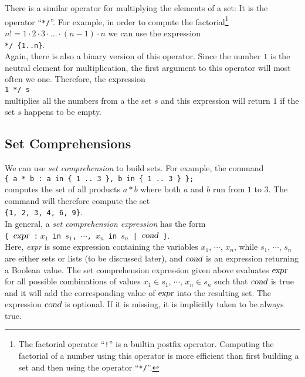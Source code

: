 There is a similar operator for multiplying the elements of a set: It is the operator
``\texttt{*/}''.
For example, in order to compute the factorial\footnote{
  The factorial operator ``\texttt{!}'' is a builtin postfix operator.  Computing
  the factorial of a number using this operator is more efficient than first building a set
  and then using the operator ``\texttt{*/}''.
}
$n! = 1 \cdot 2 \cdot 3 \cdot {\dots} \cdot (n-1) \cdot n$ we can use the expression
\\[0.2cm]
\hspace*{1.3cm}
\texttt{*/ \{1..n\}}.
\\[0.2cm]
Again, there is also a binary version of this operator.  Since the number $1$ is the
neutral element for  multiplication, the first argument to this operator will most often
we one.   Therefore, the expression
\\[0.2cm]
\hspace*{1.3cm}
\texttt{1 */ s}
\\[0.2cm]
 multiplies all the numbers from a the set $s$ and this expression will return $1$ if the
 set $s$ happens to be empty.

\subsection{Set Comprehensions}
We can use \emph{set comprehension} to build sets.  For example, the command
\\[0.2cm]
\hspace*{1.3cm}
\texttt{\{ a * b : a in \{ 1 .. 3 \}, b in \{ 1 .. 3 \} \};}
\\[0.2cm]
computes the set of all products $a * b$ where both $a$ and $b$ run from $1$ to $3$.
The command will therefore compute the set
\\[0.2cm]
\hspace*{1.3cm}
\texttt{\{1, 2, 3, 4, 6, 9\}}.
\\[0.2cm]
In general, a \emph{set comprehension expression} has the form
\\[0.2cm]
\hspace*{1.3cm}
\texttt{\{ $\textsl{expr}$ :$\;x_1$ in $s_1$, $\cdots$, $x_n$ in $s_n$ | $\textsl{cond}$ \}}.
\\[0.2cm]
Here, \textsl{expr} is some expression containing the variables $x_1$, $\cdots$, $x_n$, while
$s_1$, $\cdots$, $s_n$ are either sets or lists (to be discussed later), and $\textsl{cond}$ is an
expression returning a Boolean value.  
The  set comprehension expression given above evaluates $\textsl{expr}$ for all possible combinations of 
values $x_1 \in s_1$, $\cdots$, $x_n \in s_n$ such that $\textsl{cond}$ is true and it will add the
corresponding value of $\textsl{expr}$ into the resulting set.
The expression $\textsl{cond}$ is optional.  If it is missing, it is implicitly taken to be
always true.


